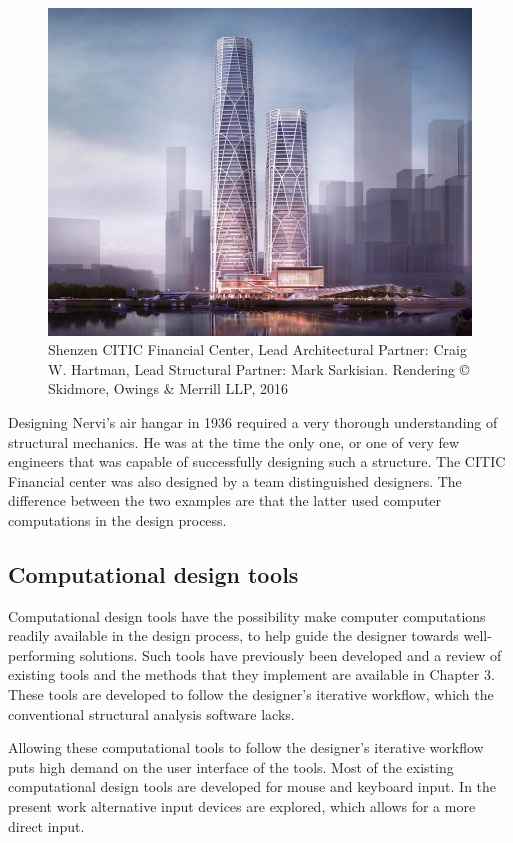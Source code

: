 \begin{figure}
  \includegraphics[width=350pt]{graphics/shenzen.jpg}
  \caption{Shenzen CITIC Financial Center, Lead Architectural Partner: Craig W. Hartman, Lead Structural Partner: Mark Sarkisian.  Rendering © Skidmore, Owings \& Merrill LLP, 2016}
  \label{fig:Shenzen}
\end{figure}

Designing Nervi’s air hangar in 1936 required a very thorough understanding of structural mechanics. He was at the time the only one, or one of very few engineers that was capable of successfully designing such a structure. The CITIC Financial center was also designed by a team distinguished designers. The difference between the two examples are that the latter used computer computations in the design process. 

\subsection{Computational design tools}
Computational design tools have the possibility make computer computations readily available in the design process, to help guide the designer towards well-performing solutions. Such tools have previously been developed and a review of existing tools and the methods that they implement are available in Chapter 3. These tools are developed to follow the designer’s iterative workflow, which the conventional structural analysis software lacks. 

Allowing these computational tools to follow the designer’s iterative workflow puts high demand on the user interface of the tools. Most of the existing computational design tools are developed for mouse and keyboard input. In the present work alternative input devices are explored, which allows for a more direct input. 

